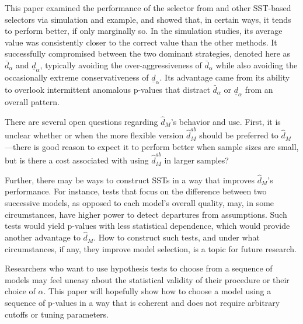 \documentclass[12pt]{article}\usepackage[]{graphicx}\usepackage[]{color}
\newcommand{\dalphaU}{\bar{d}_\alpha}
\newcommand{\dalphaB}{\underline{d}_\alpha}
\newcommand{\dhatm}{\hat{d}_M}
\newcommand{\dhatmab}{\hat{d}^{ab}_M}
\begin{document}
This paper examined the performance of the selector from
\citet{mallik} and other SST-based selectors via simulation and
example, and showed that, in certain ways, it tends to perform better,
if only marginally so.
In the simulation studies, its average value was consistently closer
to the correct value than the other methods.
It successfully compromised between the two dominant strategies,
denoted here as $\dalphaU$ and $\dalphaB$, typically avoiding the
over-aggressiveness of $\dalphaU$ while also avoiding the
occasionally extreme conservativeness of $\dalphaB$.
Its advantage came from its ability to overlook intermittent anomalous
p-values that distract $\dalphaU$ or $\dalphaB$ from an overall
pattern.

There are several open questions regarding $\dhatm$'s behavior and
use.
First, it is unclear whether or when the more flexible version
$\dhatmab$ should be preferred to $\dhatm$---there is good reason to
expect it to perform better when sample sizes are small, but is there
a cost associated with using $\dhatmab$ in larger samples?

Further, there may be ways to construct SSTs in a way that improves
$\dhatm$'s performance.
For instance, tests that focus on the difference between two
successive models, as opposed to each model's overall quality, may, in
some circumstances, have higher power to detect departures from
assumptions.
Such tests would yield p-values with less statistical dependence,
which would provide another advantage to $\dhatm$.
How to construct such tests, and under what circumstances, if any,
they improve model selection, is a topic for future research.

Researchers who want to use hypothesis tests to choose from a sequence
of models may feel uneasy about the statistical validity of their
procedure or their choice of $\alpha$.
This paper will hopefully show how to choose a model using a sequence
of p-values in a way that is coherent and does not require arbitrary
cutoffs or tuning parameters.





\end{document}

